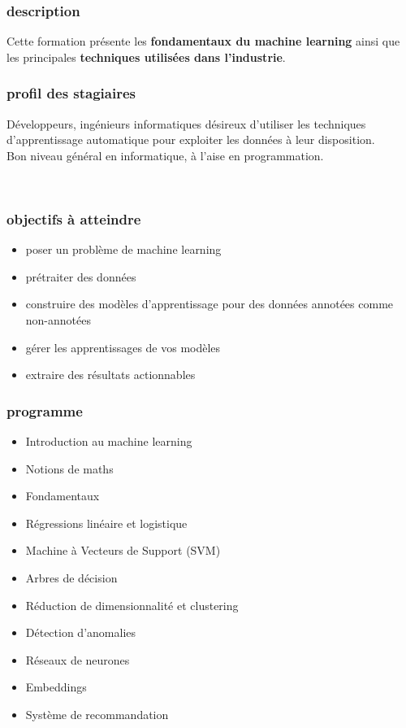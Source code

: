 \begin{frame}
  \frametitle{description}
  Cette formation présente les \textbf{fondamentaux du machine
    learning} ainsi que les principales \textbf{techniques utilisées
    dans l’industrie}.
\end{frame}

\begin{frame}
  \frametitle{profil des stagiaires}
  Développeurs, ingénieurs informatiques désireux d’utiliser les
  techniques d’apprentissage automatique pour exploiter les données à
  leur disposition. \\
  \newline
  Bon niveau général en informatique, à l’aise en programmation. \\
  \begin{center}
    \\
    $\;$\\
  \end{center}
\end{frame}

\begin{frame}
  \frametitle{objectifs à atteindre}

  \begin{itemize}
  \item poser un problème de machine learning
  \item prétraiter des données
  \item construire des modèles d'apprentissage pour des données
    annotées comme non-annotées
  \item gérer les apprentissages de vos modèles
  \item extraire des résultats actionnables
  \end{itemize}
\end{frame}

\begin{frame}
  \frametitle{programme}

  \begin{itemize}
  \item Introduction au machine learning
  \item Notions de maths
  \item Fondamentaux
  \item Régressions linéaire et logistique
  \item Machine à Vecteurs de Support (SVM)
  \item Arbres de décision
  \item Réduction de dimensionnalité et clustering
  \item Détection d'anomalies
  \item Réseaux de neurones
  \item Embeddings
  \item Système de recommandation
  \end{itemize}
\end{frame}
